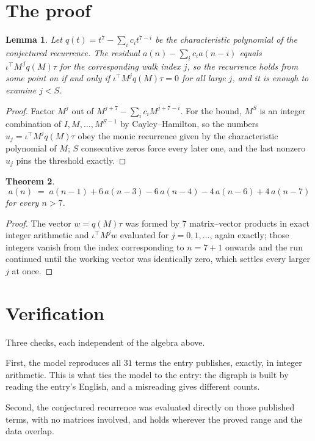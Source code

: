 \documentclass[11pt,a4paper]{article}
\theoremstyle{plain}
\newtheorem{theorem}{Theorem}
\newtheorem{lemma}[theorem]{Lemma}
\theoremstyle{definition}
\begin{document}
\section{The proof}

\begin{lemma}\label{lem:crit}
Let $q(t)=t^{7}-\sum_i c_it^{7-i}$ be the characteristic polynomial of the
conjectured recurrence. The residual $a(n)-\sum_ic_ia(n-i)$ equals
$\iota^{\!\top}M^{\,j}q(M)\tau$ for the corresponding walk index $j$, so the recurrence
holds from some point on if and only if $\iota^{\!\top}M^{j}q(M)\tau=0$ for all large $j$,
and it is enough to examine $j<S$.
\end{lemma}

\begin{proof}
Factor $M^{j}$ out of $M^{j+7}-\sum_ic_iM^{j+7-i}$. For the bound, $M^{S}$
is an integer combination of $I,M,\dots,M^{S-1}$ by Cayley--Hamilton, so the numbers
$u_j=\iota^{\!\top}M^{j}q(M)\tau$ obey the monic recurrence given by the characteristic
polynomial of $M$; $S$ consecutive zeros force every later one, and the last nonzero $u_j$
pins the threshold exactly.
\end{proof}

\begin{theorem}
\[
a(n)\;=\;a(n-1) + 6\,a(n-3) - 6\,a(n-4) - 4\,a(n-6) + 4\,a(n-7)
\]
for every $n>7$.
\end{theorem}

\begin{proof}
The vector $w=q(M)\tau$ was formed by $7$ matrix--vector products in exact integer
arithmetic and $\iota^{\!\top}M^{j}w$ evaluated for $j=0,1,\dots$, again exactly; those
integers vanish from the index corresponding to $n=7+1$ onwards and the run continued
until the working vector was identically zero, which settles every larger $j$ at once.
\end{proof}

\section{Verification}

Three checks, each independent of the algebra above.

First, the model reproduces all $31$ terms the entry publishes, exactly, in integer
arithmetic. This is what ties the model to the entry: the digraph is built by reading the
entry's English, and a misreading gives different counts.

Second, the conjectured recurrence was evaluated directly on those published terms, with no
matrices involved, and holds wherever the proved range and the data overlap.
\end{document}
